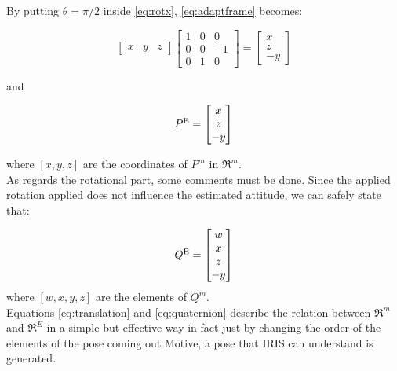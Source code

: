 By putting $\theta = \pi/2$ inside \eqref{eq:rotx}, \eqref{eq:adaptframe} becomes:

\begin{equation}
\begin{bmatrix}x&y&z\end{bmatrix}\begin{bmatrix} 1 & 0 & 0 \\
							  					 0 & 0 & -1\\
                              					 0 & 1 & 0
\end{bmatrix} = \begin{bmatrix}x\\z\\-y\end{bmatrix}
\label{eq:rotexplained}
\end{equation}

and

\begin{equation}
P\textsuperscript{E} = \begin{bmatrix}x\\z\\-y\end{bmatrix}
\label{eq:translation}
\end{equation}

where $[x, y, z]$ are the coordinates of $P^m$ in $\Re^m$.\\

\noindent
As regards the rotational part, some comments must be done. Since the applied rotation applied does not influence the estimated attitude, we can safely state that:

\begin{equation}
Q\textsuperscript{E} = \begin{bmatrix}
w\\x\\z\\-y
\end{bmatrix}
\label{eq:quaternion}
\end{equation}
where $[w, x, y, z]$ are the elements of $Q^m$.\\

\noindent
Equations \eqref{eq:translation} and \eqref{eq:quaternion} describe the relation between $\Re^m$ and  $\Re^E$ in a simple but effective way in fact just by changing the order of the elements of the pose coming out Motive, a pose that IRIS can understand is generated. 
    